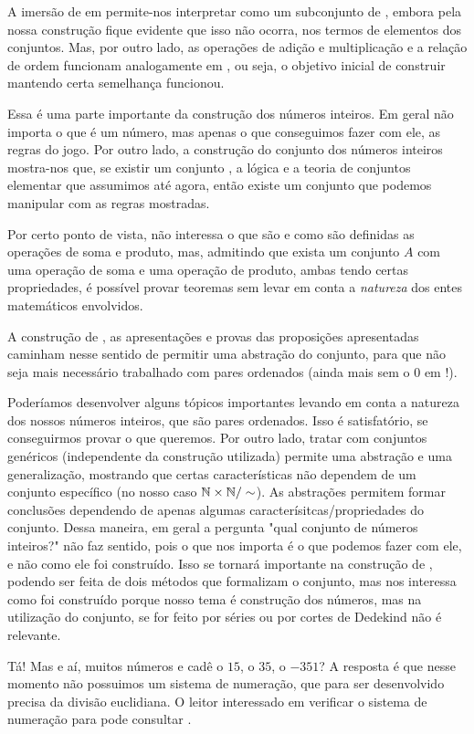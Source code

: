 \documentclass[../main.tex]{subfiles}
\begin{document}
A imersão de \N em \Z permite-nos interpretar \N como um subconjunto de \Z, embora pela nossa construção fique evidente que isso não ocorra, nos termos de elementos dos conjuntos. Mas, por outro lado, as operações de adição e multiplicação e a relação de ordem funcionam analogamente em \Z, ou seja, o objetivo inicial de construir mantendo certa semelhança funcionou.

Essa é uma parte importante da construção dos números inteiros. Em geral não importa o que é um número, mas apenas o que conseguimos fazer com ele, as regras do jogo. Por outro lado, a construção do conjunto dos números inteiros mostra-nos que, se existir um conjunto \N, a lógica e a teoria de conjuntos elementar que assumimos até agora, então existe um conjunto \Z que podemos manipular com as regras mostradas.

Por certo ponto de vista, não interessa o que são e como são definidas as operações de soma e produto, mas, admitindo que exista um conjunto $A$ com uma operação de soma e uma operação de produto, ambas tendo certas propriedades, é possível provar teoremas sem levar em conta a \emph{natureza} dos entes matemáticos envolvidos.

A construção de \Z, as apresentações e provas das proposições apresentadas caminham nesse sentido de permitir uma abstração do conjunto, para que não seja mais necessário trabalhado com pares ordenados (ainda mais sem o $0$ em \N!).

Poderíamos desenvolver alguns tópicos importantes levando em conta a natureza dos nossos números inteiros, que são pares ordenados. Isso é satisfatório, se conseguirmos provar o que queremos. Por outro lado, tratar com conjuntos genéricos (independente da construção utilizada) permite uma abstração e uma generalização, mostrando que certas características não dependem de um conjunto específico (no nosso caso $\mathbb{N} \times \mathbb{N} / \sim$). As abstrações permitem formar conclusões dependendo de apenas algumas caracterísitcas/propriedades do conjunto. Dessa maneira, em geral a pergunta "qual conjunto de números inteiros?" não faz sentido, pois o que nos importa é o que podemos fazer com ele, e não como ele foi construído. Isso se tornará importante na construção de \R, podendo ser feita de dois métodos que formalizam o conjunto, mas nos interessa como \R foi construído porque nosso tema é construção dos números, mas na utilização do conjunto, se for feito por séries ou por cortes de Dedekind não é relevante. 

Tá! Mas e aí, muitos números e cadê o $15$, o $35$, o $-351$? A resposta é que nesse momento não possuimos um sistema de numeração, que para ser desenvolvido precisa da divisão euclidiana. O leitor interessado em verificar o sistema de numeração para \Z pode consultar \cite{hefez-algebra}.
\end{document}
